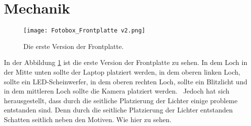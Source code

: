 \graphicspath{{images/mechanics}}

\section{Mechanik}
\begin{figure}[h]
    \centering
    \texttt{[image: Fotobox\_Frontplatte v2.png]}
    \caption{Die erste Version der Frontplatte.}
    \label{fig:frontplatte_v1}
\end{figure}

In der Abbildung \ref{fig:frontplatte_v1} ist die erste Version der Frontplatte zu sehen.
In dem Loch in der Mitte unten sollte der Laptop platziert werden, in dem oberen linken Loch,
sollte ein LED-Scheinwerfer, in dem oberen rechten Loch, sollte ein Blitzlicht und in dem
mittleren Loch sollte die Kamera platziert werden.
\
Jedoch hat sich herausgestellt, dass durch die seitliche Platzierung der Lichter einige probleme entstanden sind.
Denn durch die seitliche Platzierung der Lichter entstanden Schatten seitlich neben den Motiven.
Wie hier zu sehen.
